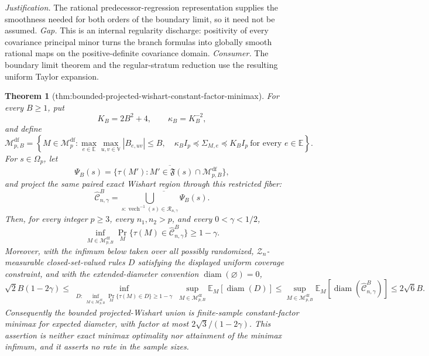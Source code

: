 \documentclass{article}
\newtheorem{theorem}{Theorem}
\begin{document}
\par\smallskip\noindent \textit{Justification.} The rational predecessor-regression representation supplies the smoothness needed for both orders of the boundary limit, so it need not be assumed. \textit{Gap.} This is an internal regularity discharge: positivity of every covariance principal minor turns the branch formulas into globally smooth rational maps on the positive-definite covariance domain. \textit{Consumer.} The boundary limit theorem and the regular-stratum reduction use the resulting uniform Taylor expansion.

\begin{theorem}[thm:bounded-projected-wishart-constant-factor-minimax]\label{thm:bounded-projected-wishart-constant-factor-minimax}
For every \(B\ge1\), put
\[
K_B=2B^2+4,
\qquad
\kappa_B=K_B^{-2},
\]
and define
\[
\mathcal M_{p,B}^{\mathrm{df}}
=\left\{M\in\mathcal M_p^{\mathrm{df}}:
\max_{e\in\mathbb E}\max_{u,v\in\mathbb V}|B_{e,uv}|\le B,
\quad
\kappa_B I_p\preceq\Sigma_{M,e}\preceq K_BI_p
\ \text{for every }e\in\mathbb E\right\}.
\]
For \(s\in\Omega_p\), let
\[
\Psi_B(s)
=\overline{\{\tau(M'):M'\in\mathfrak F(s)\cap
\mathcal M_{p,B}^{\mathrm{df}}\}},
\]
and project the same paired exact Wishart region through this restricted fiber:
\[
\widehat{\mathcal C}^{B}_{n,\gamma}
=\overline{\bigcup_{s:\operatorname{vech}^{-1}(s)\in
\mathcal R_{n,\gamma}}\Psi_B(s)}.
\]
Then, for every integer \(p\ge3\), every \(n_1,n_2>p\), and every \(0<\gamma<1/2\),
\[
\inf_{M\in\mathcal M_{p,B}^{\mathrm{df}}}
\Pr_M\{\tau(M)\in\widehat{\mathcal C}^{B}_{n,\gamma}\}
\ge1-\gamma.
\]
Moreover, with the infimum below taken over all possibly randomized, \(\mathcal Z_n\)-measurable closed-set-valued rules \(D\) satisfying the displayed uniform coverage constraint, and with the extended-diameter convention \(\operatorname{diam}(\varnothing)=0\),
\[
\sqrt2 B(1-2\gamma)
\le
\inf_{\substack{D:\ 
 \inf_{M\in\mathcal M_{p,B}^{\mathrm{df}}}
 \Pr_M\{\tau(M)\in D\}\ge1-\gamma}}
\sup_{M\in\mathcal M_{p,B}^{\mathrm{df}}}
\mathbb E_M[\operatorname{diam}(D)]
\le
\sup_{M\in\mathcal M_{p,B}^{\mathrm{df}}}
\mathbb E_M[\operatorname{diam}(\widehat{\mathcal C}^{B}_{n,\gamma})]
\le2\sqrt6 B.
\]
Consequently the bounded projected-Wishart union is finite-sample constant-factor minimax for expected diameter, with factor at most \(2\sqrt3/(1-2\gamma)\).  This assertion is neither exact minimax optimality nor attainment of the minimax infimum, and it asserts no rate in the sample sizes.
\end{theorem}
\end{document}
